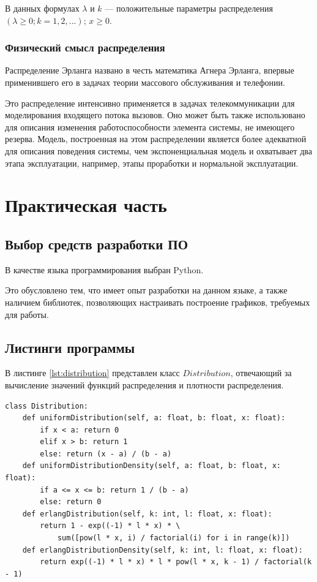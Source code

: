 В данных формулах $\lambda$ и $k$ --- положительные параметры распределения $(\lambda \geq 0; k = 1, 2, ...)$; $x \geq 0$.
\subsection*{Физический смысл распределения}
Распределение Эрланга названо в честь математика Агнера Эрланга, впервые применившего его в задачах теории массового обслуживания и телефонии. 

Это распределение интенсивно применяется в задачах телекоммуникации для моделирования входящего потока вызовов. Оно может быть также использовано для описания изменения работоспособности элемента системы, не имеющего резерва. Модель, построенная на этом распределении является более адекватной для описания поведения системы, чем экспоненциальная модель и охватывает два этапа эксплуатации, например, этапы проработки и нормальной эксплуатации. 
\chapter{Практическая часть}
\section{Выбор средств разработки ПО}
В качестве языка программирования выбран Python. 

Это обусловлено тем, что имеет опыт разработки на данном языке, а также наличием библиотек, позволяющих настраивать построение графиков, требуемых для работы.
\section{Листинги программы}

В листинге \ref{lst:distribution} представлен класс $Distribution$, отвечающий за вычисление значений функций распределения и плотности распределения.

\begin{lstlisting}[label=lst:distribution, caption=class Distribution]
class Distribution:
    def uniformDistribution(self, a: float, b: float, x: float):
        if x < a: return 0
        elif x > b: return 1
        else: return (x - a) / (b - a)
    def uniformDistributionDensity(self, a: float, b: float, x: float):
        if a <= x <= b: return 1 / (b - a)
        else: return 0
    def erlangDistribution(self, k: int, l: float, x: float):
        return 1 - exp((-1) * l * x) * \
            sum([pow(l * x, i) / factorial(i) for i in range(k)])
    def erlangDistributionDensity(self, k: int, l: float, x: float):
        return exp((-1) * l * x) * l * pow(l * x, k - 1) / factorial(k - 1)
\end{lstlisting}

